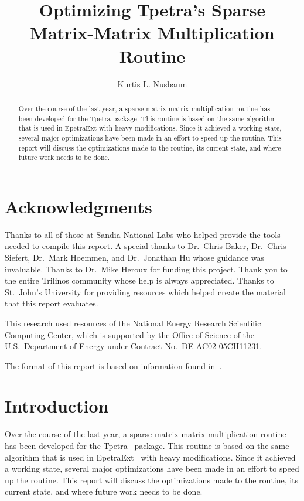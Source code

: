 \documentclass[pdf,12pt]{SANDreport}
\title{Optimizing Tpetra's Sparse Matrix-Matrix Multiplication Routine}
\author{Kurtis L. Nusbaum}
\date{}
\begin{document}
\VerbatimFootnotes

\maketitle

\begin{abstract}
Over the course of the last year, a sparse matrix-matrix multiplication routine has been developed for the Tpetra package.
This routine is based on the same algorithm that is used in EpetraExt with heavy modifications. Since it 
achieved a working state, several major optimizations have been made in an effort to speed up the routine. This report will
discuss the optimizations made to the routine, its current state, and where future work needs to be done.
\end{abstract}
\clearpage
\section*{Acknowledgments}
Thanks to all of those at Sandia National Labs who helped provide the tools needed to compile this report. 
A special thanks to Dr.\ Chris Baker, Dr.\ Chris 
Siefert, Dr.\ Mark Hoemmen, and Dr.\ Jonathan Hu whose guidance was invaluable. Thanks to Dr.\ Mike Heroux for funding this 
project. Thank you to the entire Trilinos community whose help is always appreciated. Thanks to St.\ John's University
for providing resources which helped create the material that this report evaluates. 

This research used resources of the National Energy Research Scientific Computing Center, which is supported by the
Office of Science of the U.S.\ Department of Energy under Contract No.\ DE-AC02-05CH11231.

The format of this report is based on information found in~\cite{Sand98-0730}.
\cleardoublepage
\tableofcontents
\listoffigures
\listoftables
\clearpage

\SANDmain
\section{Introduction}
Over the course of the last year, a sparse matrix-matrix multiplication routine has been developed for the 
Tpetra~\cite{TpetraHomePage}
package. This routine is based on the same algorithm that is used in EpetraExt~\cite{EpetraExtHomePage} 
with heavy modifications. Since it achieved a working state, several major optimizations have been made in an 
effort to speed up the routine. This report will
discuss the optimizations made to the routine, its current state, and where future work needs to be done.
\end{document}

